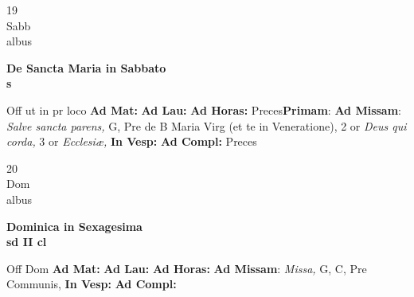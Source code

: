 \documentclass[10pt, openany]{book}
\begin{document}
        \begin{center}
            \begin{minipage}{3.5in}
                \vspace{2em}
                \begin{minipage}{0.5in}
                    {\Huge 19} \\
                    {\normalsize Sabb} \\
                    {\normalsize albus}
                \end{minipage}
                \begin{minipage}{3.0in}
                    \textbf{ \large De Sancta Maria in Sabbato \\
                    \textnormal{\normalsize s}} \\ 
                \end{minipage}
                \begin{justify}Off ut in pr loco
                    \textbf{Ad Mat: }
                    \textbf{Ad Lau: }
                    \textbf{Ad Horas: }Preces\textbf{Primam}: \textbf{Ad Missam}: \textit{Salve sancta parens,} G, Pre de B Maria Virg (et te in Veneratione), 2 or \textit{Deus qui corda,} 3 or \textit{Ecclesiæ,}  
                    \textbf{In Vesp: }
                    \textbf{Ad Compl: }Preces
                \end{justify}
            \end{minipage}
        \end{center}
    
        \begin{center}
            \begin{minipage}{3.5in}
                \vspace{2em}
                \begin{minipage}{0.5in}
                    {\Huge 20} \\
                    {\normalsize Dom} \\
                    {\normalsize albus}
                \end{minipage}
                \begin{minipage}{3.0in}
                    \textbf{ \large Dominica in Sexagesima \\
                    \textnormal{\normalsize sd II cl}} \\ 
                \end{minipage}
                \begin{justify}Off Dom
                    \textbf{Ad Mat: }
                    \textbf{Ad Lau: }
                    \textbf{Ad Horas: }\textbf{Ad Missam}: \textit{Missa,} G, C, Pre Communis,  
                    \textbf{In Vesp: }
                    \textbf{Ad Compl: }
                \end{justify}
            \end{minipage}
        \end{center}
    
\end{document}
